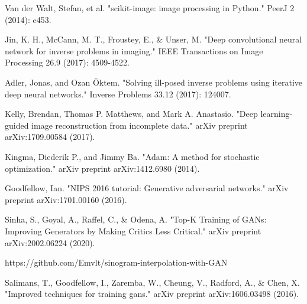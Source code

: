 \begin{thebibliography}{00}
 Van der Walt, Stefan, et al. "scikit-image: image processing in Python." PeerJ 2 (2014): e453.

Jin, K. H., McCann, M. T., Froustey, E., \& Unser, M. "Deep convolutional neural network for inverse problems in imaging." IEEE Transactions on Image Processing 26.9 (2017): 4509-4522.

Adler, Jonas, and Ozan Öktem. "Solving ill-posed inverse problems using iterative deep neural networks." Inverse Problems 33.12 (2017): 124007.

Kelly, Brendan, Thomas P. Matthews, and Mark A. Anastasio. "Deep learning-guided image reconstruction from incomplete data." arXiv preprint arXiv:1709.00584 (2017).

Kingma, Diederik P., and Jimmy Ba. "Adam: A method for stochastic optimization." arXiv preprint arXiv:1412.6980 (2014).

Goodfellow, Ian. "NIPS 2016 tutorial: Generative adversarial networks." arXiv preprint arXiv:1701.00160 (2016).

Sinha, S., Goyal, A., Raffel, C., \& Odena, A.  "Top-K Training of GANs: Improving Generators by Making Critics Less Critical." arXiv preprint arXiv:2002.06224 (2020).

 https://github.com/Emvlt/sinogram-interpolation-with-GAN

Salimans, T., Goodfellow, I., Zaremba, W., Cheung, V., Radford, A., \& Chen, X. "Improved techniques for training gans." arXiv preprint arXiv:1606.03498 (2016).

\end{thebibliography}